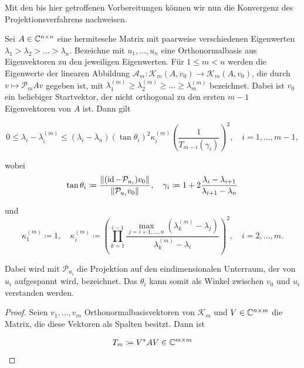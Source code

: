 \documentclass{article}
\begin{document}
Mit den bis hier getroffenen Vorbereitungen können wir nun die Konvergenz des Projektionsverfahrens nachweisen.

\begin{theorem}
	Sei $A \in \mathbb{C}^{n \times n}$ eine hermitesche Matrix mit paarweise verschiedenen Eigenwerten $\lambda_1 > \lambda_2 > \dots > \lambda_n$. Bezeichne mit $u_1,\dots,u_n$ eine Orthonormalbasis aus Eigenvektoren zu den jeweiligen Eigenwerten. Für $1 \le m < n$ werden die Eigenwerte der linearen Abbildung $\mathcal{A}_m: \mathcal{K}_m(A,v_0)\rightarrow \mathcal{K}_m(A,v_0)$, die durch $v \mapsto \mathcal{P}_mAv$ gegeben ist,  mit $\lambda_1^{(m)} \ge \lambda_2^{(m)} \ge \dots \ge \lambda_m^{(m)}$ bezeichnet. Dabei ist $v_0$ ein beliebiger Startvektor, der nicht orthogonal zu den ersten $m-1$ Eigenvektoren von $A$ ist. Dann gilt

	\begin{equation}
		\label{konvergenz Eigenwerte}
		0 \le \lambda_i - \lambda_i^{(m)} \le (\lambda_i -\lambda_n) (\tan\theta_i)^2 \kappa_i^{(m)} \left(\frac{1}{T_{m-i}(\gamma_i)}\right)^2, \quad i=1,\dots,m-1,
	\end{equation}

	wobei
	\begin{equation*}
		\tan \theta_i \coloneqq \frac{{\left \| (\operatorname{id} - \mathcal{P}_{u_i})v_0 \right \|}_{}}{{\left \|  \mathcal{P}_{u_i}v_0 \right \|}_{}}, \quad \gamma_i \coloneqq 1+2 \frac{\lambda_i-\lambda_{i+1}}{\lambda_{i+1} -\lambda_n}
	\end{equation*}

	und
	\begin{equation*}
		\kappa_1^{(m)} \coloneqq 1, \quad \kappa_i^{(m)} \coloneqq \left(\prod_{k=1}^{i-1} \frac{\max_{j=i+1,\dots,n} (\lambda_k^{(m)} - \lambda_j)}{\lambda_k^{(m)} - \lambda_i}\right)^2, \quad i = 2,\dots,m.
	\end{equation*}

	Dabei wird mit $\mathcal{P}_{u_i}$ die Projektion auf den eindimensionalen Unterraum, der von $u_i$ aufgespannt wird, bezeichnet. Das $\theta_i$ kann somit als Winkel zwischen $v_0$ und $u_i$  verstanden werden.
	\begin{proof}

	Seien $v_1, \dots, v_m$ Orthonormalbasisvektoren von $\mathcal{K}_m$ und $V \in \mathbb{C}^{n\times m}$ die Matrix, die diese Vektoren als Spalten besitzt. Dann ist

	\begin{equation*}
		T_m \coloneqq V^* A V \in \mathbb{C}^{m\times m}
	\end{equation*}


\end{proof}
\end{theorem}
\end{document}
